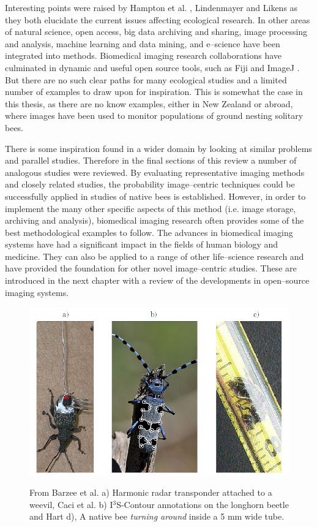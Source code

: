 Interesting points were raised by Hampton et al. \cite{Hampton2013}, Lindenmayer and Likens \cite{Lindenmayer2013} as they both elucidate the current issues affecting ecological research. In other areas of natural science, open access, big data archiving and sharing, image processing and analysis, machine learning and data mining, and e--science have been integrated into methods.  Biomedical imaging research collaborations have culminated in dynamic and useful open source tools, such as \ac{Fiji} and ImageJ \cite{Schneider2012}. But there are no such clear paths for many ecological studies and a limited number of examples to draw upon for inspiration. This is somewhat the case in this thesis, as there are no know examples, either in New Zealand or abroad, where images have been used to monitor populations of ground nesting solitary bees.

There is some inspiration found in a wider domain by looking at similar problems and parallel studies. Therefore in the final sections of this review a number of analogous studies were reviewed. By evaluating representative imaging methods and closely related studies, the probability image--centric techniques could be successfully applied in studies of native bees is established. However, in order to implement the many other specific aspects of this method (i.e. image storage, archiving and analysis), biomedical imaging research often provides some of the best methodological examples to follow. The advances in biomedical imaging systems have had a significant impact in the fields of human biology and medicine. They can also be applied to a range of other life--science research and have provided the foundation for other novel image--centric studies. These are introduced in the next chapter with a review of the developments in open--source imaging systems. 

\begin{figure}[!htbp]
\myfloatalign
{\includegraphics[width=0.85\linewidth]{gfx2/weevil_beetle}}
\caption [Harmonic radar and I$^3$S-Contour.]{From Barzee et al. \cite{Brazee2005} a) Harmonic radar transponder attached to a weevil, Caci et al. b) I$^3$S-Contour annotations on the longhorn beetle \cite[pg.788]{Caci2013} and Hart \cite[pg.78]{Hart2007} d), A native bee \emph{turning around} inside a 5 mm wide tube.} \label{fig:weevil_beetle}
\end{figure}


